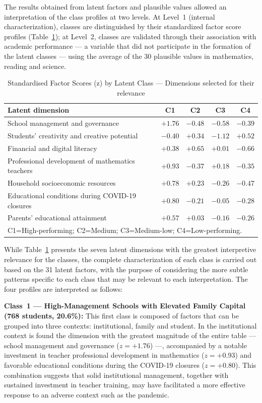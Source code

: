 \documentclass[runningheads]{llncs}
\begin{document}
The results obtained from latent factors and plausible values
allowed an interpretation of the class profiles at two levels.
At Level~1 (internal characterization), classes are
distinguished by their standardized factor score profiles
(Table~\ref{tab:lca_zscores}); at Level~2, classes are validated
through their association with academic performance --- a
variable that did not participate in the formation of the latent
classes --- using the average of the 30 plausible values in
mathematics, reading and science.

\begin{table}[!htbp]
\centering
\caption{Standardised Factor Scores (z) by Latent Class ---
Dimensions selected for their relevance}
\label{tab:lca_zscores}
\begin{tabular}{lcccc}
\toprule
\textbf{Latent dimension} &
  \textbf{C1} & \textbf{C2} & \textbf{C3} & \textbf{C4} \\
\midrule
School management and governance                 & $+1.76$ & $-0.48$ & $-0.58$ & $-0.39$ \\
Students' creativity and creative potential      & $-0.40$ & $+0.34$ & $-1.12$ & $+0.52$ \\
Financial and digital literacy                   & $+0.38$ & $+0.65$ & $+0.01$ & $-0.66$ \\
Professional development of mathematics teachers & $+0.93$ & $-0.37$ & $+0.18$ & $-0.35$ \\
Household socioeconomic resources                & $+0.78$ & $+0.23$ & $-0.26$ & $-0.47$ \\
Educational conditions during COVID-19 closures  & $+0.80$ & $-0.21$ & $-0.05$ & $-0.28$ \\
Parents' educational attainment                  & $+0.57$ & $+0.03$ & $-0.16$ & $-0.26$ \\
\bottomrule
\multicolumn{5}{l}{\footnotesize
  C1=High-performing; C2=Medium; C3=Medium-low; C4=Low-performing.}
\end{tabular}
\end{table}

While Table~\ref{tab:lca_zscores} presents the seven latent
dimensions with the greatest interpretive relevance for the
classes, the complete characterization of each class is carried
out based on the 31 latent factors, with the purpose of
considering the more subtle patterns specific to each class that
may be relevant to each interpretation. The four profiles are
interpreted as follows:

\textbf{Class~1 --- High-Management Schools with Elevated Family
Capital (768 students, 20.6\%):} This first class is composed of
factors that can be grouped into three contexts: institutional,
family and student. In the institutional context is found the
dimension with the greatest magnitude of the entire table ---
school management and governance (\(z = +1.76\)) ---, accompanied
by a notable investment in teacher professional development in
mathematics (\(z = +0.93\)) and favorable educational conditions
during the COVID-19 closures (\(z = +0.80\)). This combination
suggests that solid institutional management, together with
sustained investment in teacher training, may have facilitated a
more effective response to an adverse context such as the
pandemic.
\end{document}

